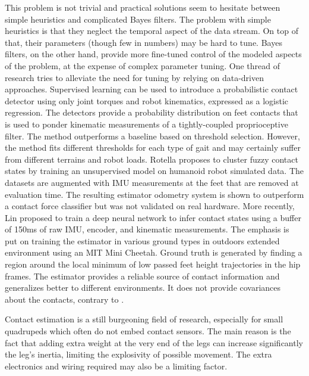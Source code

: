 This problem is not trivial and practical solutions seem to hesitate between simple heuristics and complicated Bayes filters. 
The problem with simple heuristics is that they neglect the temporal aspect of the data stream. On top of that, their parameters (though few in numbers) may be hard to tune.
Bayes filters, on the other hand, provide more fine-tuned control of the modeled aspects of the problem, at the expense of complex parameter tuning.
One thread of research tries to alleviate the need for tuning by relying on data-driven approaches. Supervised learning can be used \cite{camurri2017probabilistic} 
to introduce a probabilistic contact detector using only joint torques and robot kinematics, expressed as a logistic regression. 
The detectors provide a probability distribution on feet contacts that is used to ponder kinematic measurements of a tightly-coupled proprioceptive filter. 
The method outperforms a baseline based on threshold selection. However, the method %
fits different thresholds for each type of gait and may certainly suffer from different terrains and robot loads. 
Rotella \cite{rotella2018unsupervised} proposes to cluster fuzzy contact states by training an unsupervised model on humanoid robot simulated data. The datasets are augmented
with IMU measurements at the feet that are removed at evaluation time. The resulting estimator odometry system is shown to outperform a contact force classifier
but was not validated on real hardware. More recently, Lin \cite{lin2021deep} proposed to train a deep neural network to infer contact states using a buffer of 150ms of raw IMU, 
encoder, and kinematic measurements. The emphasis is put on training the estimator in various ground types in outdoors extended environment using an MIT Mini Cheetah. Ground truth is generated
by finding a region around the local minimum of low passed feet height trajectories in the hip frames. The estimator provides a reliable source of contact information 
and generalizes better to different environments. It does not provide covariances about the contacts, contrary to \cite{camurri2017probabilistic}.  

Contact estimation is a still burgeoning field of research, especially for small quadrupeds which often do not embed contact sensors. The main reason 
is the fact that adding extra weight at the very end of the legs can increase significantly the leg's inertia, limiting the explosivity of possible movement. The 
extra electronics and wiring required may also be a limiting factor.  


